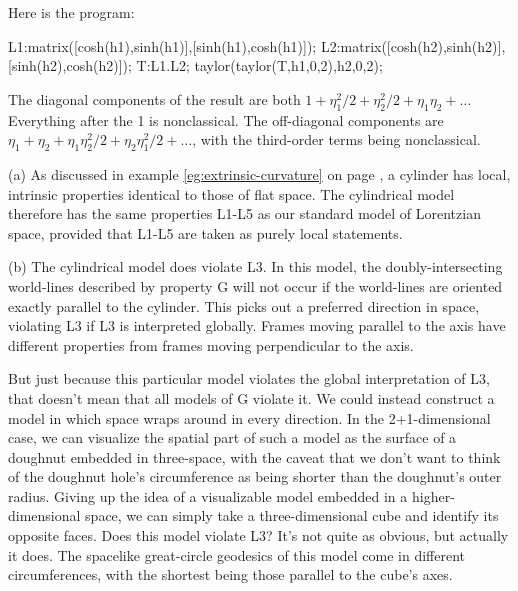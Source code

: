 
Here is the program:
\begin{listing}{1}
L1:matrix([cosh(h1),sinh(h1)],[sinh(h1),cosh(h1)]);
L2:matrix([cosh(h2),sinh(h2)],[sinh(h2),cosh(h2)]);
T:L1.L2;
taylor(taylor(T,h1,0,2),h2,0,2);
\end{listing}
The diagonal components of the result are both $1+\eta_1^2/2+\eta_2^2/2+\eta_1\eta_2+\ldots$
Everything after the 1 is nonclassical. The 
off-diagonal components are $\eta_1+\eta_2+\eta_1\eta_2^2/2+\eta_2\eta_1^2/2+\ldots$,
with the third-order terms being nonclassical.



(a) As discussed in example \ref{eg:extrinsic-curvature} on page \pageref{eg:extrinsic-curvature}, a cylinder has local,
intrinsic properties identical to those of flat space. The cylindrical model therefore has the same properties L1-L5
as our standard model of Lorentzian space, provided that L1-L5 are taken as purely local statements.

(b) The cylindrical model does violate L3. In this model, the doubly-intersecting world-lines
described by property G will not occur if the world-lines are oriented exactly parallel to the cylinder. This picks
out a preferred direction in space, violating L3 if L3 is interpreted globally. Frames moving parallel to the axis have
different properties from frames moving perpendicular to the axis.

But just because this particular model violates the
global interpretation of L3, that doesn't mean that all models of G violate it. We could instead construct a model in
which space wraps around in every direction. In the 2+1-dimensional case, we can visualize the spatial part of such a model as the surface
of a doughnut embedded in three-space, with the caveat that we don't want to think of the doughnut hole's circumference as being
shorter than the doughnut's outer radius. Giving up the idea of a visualizable model embedded in a higher-dimensional space,
we can simply take a three-dimensional cube and identify its opposite faces. Does this model violate L3? It's not quite as
obvious, but actually it does. The spacelike great-circle geodesics of this model come in different circumferences, with the shortest
being those parallel to the cube's axes.


